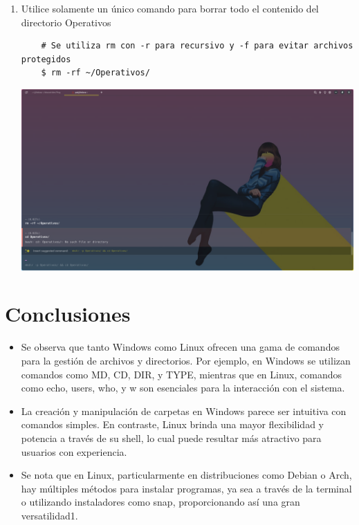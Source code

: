 \documentclass{article}
\begin{document}
\begin{enumerate}
    \item Utilice solamente un único comando para borrar todo el contenido del directorio Operativos
    \begin{verbatim}
    # Se utiliza rm con -r para recursivo y -f para evitar archivos protegidos
    $ rm -rf ~/Operativos/
    \end{verbatim}
    \includegraphics[scale=0.25,trim={0 0 20cm 25cm},clip]{LinuxCapturas/remove.png}

\end{enumerate}

\section{Conclusiones}
\begin{itemize}
    \item Se observa que tanto Windows como Linux ofrecen una gama de comandos para la gestión de archivos y directorios. Por ejemplo, en Windows se utilizan comandos como MD, CD, DIR, y TYPE, mientras que en Linux, comandos como echo, users, who, y w son esenciales para la interacción con el sistema.
    \item La creación y manipulación de carpetas en Windows parece ser intuitiva con comandos simples. En contraste, Linux brinda una mayor flexibilidad y potencia a través de su shell, lo cual puede resultar más atractivo para usuarios con experiencia.
    \item Se nota que en Linux, particularmente en distribuciones como Debian o Arch, hay múltiples métodos para instalar programas, ya sea a través de la terminal o utilizando instaladores como snap, proporcionando así una gran versatilidad1.
\end{itemize}
\end{document}
